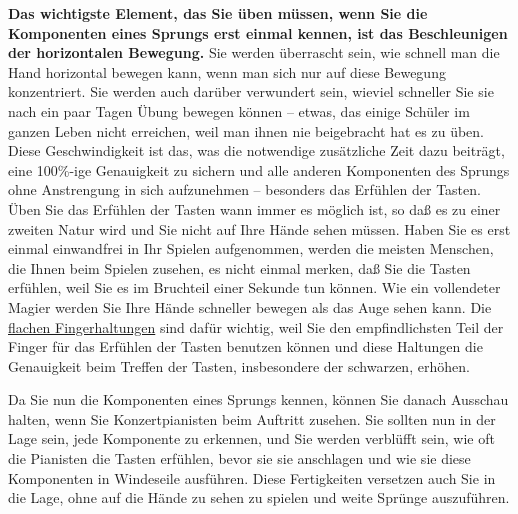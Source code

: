 \textbf{Das wichtigste Element, das Sie üben müssen, wenn Sie die Komponenten eines Sprungs erst einmal kennen, ist das Beschleunigen der horizontalen Bewegung.}
Sie werden überrascht sein, wie schnell man die Hand horizontal bewegen kann, wenn man sich nur auf diese Bewegung konzentriert.
Sie werden auch darüber verwundert sein, wieviel schneller Sie sie nach ein paar Tagen Übung bewegen können -- etwas, das einige Schüler im ganzen Leben nicht erreichen, weil man ihnen nie beigebracht hat es zu üben.
Diese Geschwindigkeit ist das, was die notwendige zusätzliche Zeit dazu beiträgt, eine 100\%-ige Genauigkeit zu sichern und alle anderen Komponenten des Sprungs ohne Anstrengung in sich aufzunehmen -- besonders das Erfühlen der Tasten.
Üben Sie das Erfühlen der Tasten wann immer es möglich ist, so daß es zu einer zweiten Natur wird und Sie nicht auf Ihre Hände sehen müssen.
Haben Sie es erst einmal einwandfrei in Ihr Spielen aufgenommen, werden die meisten Menschen, die Ihnen beim Spielen zusehen, es nicht einmal merken, daß Sie die Tasten erfühlen, weil Sie es im Bruchteil einer Sekunde tun können.
Wie ein vollendeter Magier werden Sie Ihre Hände schneller bewegen als das Auge sehen kann.
Die \hyperref[c1iii4b]{flachen Fingerhaltungen} sind dafür wichtig, weil Sie den empfindlichsten Teil der Finger für das Erfühlen der Tasten benutzen können und diese Haltungen die Genauigkeit beim Treffen der Tasten, insbesondere der schwarzen, erhöhen.

Da Sie nun die Komponenten eines Sprungs kennen, können Sie danach Ausschau halten, wenn Sie Konzertpianisten beim Auftritt zusehen.
Sie sollten nun in der Lage sein, jede Komponente zu erkennen, und Sie werden verblüfft sein, wie oft die Pianisten die Tasten erfühlen, bevor sie sie anschlagen und wie sie diese Komponenten in Windeseile ausführen.
Diese Fertigkeiten versetzen auch Sie in die Lage, ohne auf die Hände zu sehen zu spielen und weite Sprünge auszuführen.

